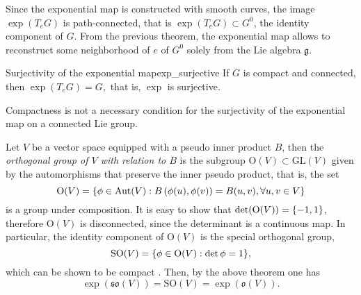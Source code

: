 Since the exponential map is constructed with smooth curves, the image \(\exp(T_eG)\) is path-connected, that is \(\exp(T_eG) \subset G^0\), the identity component of \(G\). From the previous theorem, the exponential map allows to reconstruct some neighborhood of \(e\) of \(G^0\) solely from the Lie algebra \(\mathfrak{g}.\)
\begin{theorem}{Surjectivity of the exponential map}{exp_surjective}
    If \(G\) is compact and connected, then \(\exp(T_eG) = G,\) that is, \(\exp\) is surjective.
\end{theorem}
\begin{remark}
    Compactness is not a necessary condition for the surjectivity of the exponential map on a connected Lie group.
\end{remark}
\begin{example}
    Let \(V\) be a vector space equipped with a pseudo inner product \(B\), then the \emph{orthogonal group of \(V\) with relation to \(B\)} is the subgroup \(\mathrm{O}(V) \subset \mathrm{GL}(V)\) given by the automorphisms that preserve the inner pseudo product, that is, the set
    \begin{equation*}
        \mathrm{O}(V) = \set*{\phi \in \mathrm{Aut}(V) : B\left(\phi(u), \phi(v)\right) = B(u,v), \forall u,v \in V}
    \end{equation*}
    is a group under composition. It is easy to show that \(\det(\mathrm{O}(V)) = \set{-1,1}\), therefore \(\mathrm{O}(V)\) is disconnected, since the determinant is a continuous map. In particular, the identity component of \(\mathrm{O}(V)\) is the special orthogonal group,
    \begin{equation*}
        \mathrm{SO}(V) = \set*{\phi \in \mathrm{O}(V) : \det \phi = 1},
    \end{equation*}
    which can be shown to be compact . Then, by the above theorem one has
    \begin{equation*}
        \exp\left(\mathfrak{so}(V)\right) = \mathrm{SO}(V) = \exp\left(\mathfrak{o}(V)\right).
    \end{equation*}
\end{example}
